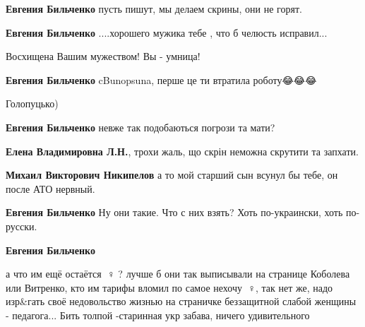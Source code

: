 \begin{itemize}
\textbf{Евгения Бильченко} пусть пишут, мы делаем скрины, они не горят.


\textbf{Евгения Бильченко} ....хорошего мужика тебе , что б челюсть исправил...


Восхищена Вашим мужеством! Вы - умница!


\textbf{Евгения Бильченко} cBunopsuna, перше це ти втратила роботу😂😂😂


Голопуцько)


\textbf{Евгения Бильченко} невже так подобаються погрози та мати?


\textbf{Елена Владимировна Л.Н.}, трохи жаль, що скрін неможна скрутити та запхати.


\textbf{Михаил Викторович Никипелов} а то мой старший сын всунул бы тебе, он после АТО нервный.


\textbf{Евгения Бильченко} Ну они такие. Что с них взять? Хоть по-украински, хоть по-русски.


\textbf{Евгения Бильченко} 

а что им ещё остаётся 🤦♀️ ? лучше б они так
выписывали на странице Коболева или Витренко, кто им тарифы вломил по самое
нехочу 🤦♀️, так нет же, надо изр\&гать своё недовольство жизнью на страничке
беззащитной слабой женщины - педагога... Бить толпой -старинная укр забава,
ничего удивительного

\end{itemize}

